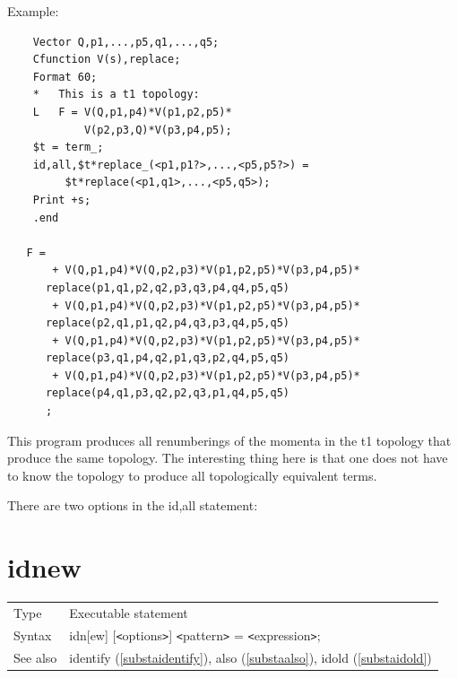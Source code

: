 \noindent Example:
\begin{verbatim}
    Vector Q,p1,...,p5,q1,...,q5;
    Cfunction V(s),replace;
    Format 60;
    *   This is a t1 topology:
    L   F = V(Q,p1,p4)*V(p1,p2,p5)*
            V(p2,p3,Q)*V(p3,p4,p5);
    $t = term_;
    id,all,$t*replace_(<p1,p1?>,...,<p5,p5?>) =
         $t*replace(<p1,q1>,...,<p5,q5>);
    Print +s;
    .end

   F =
       + V(Q,p1,p4)*V(Q,p2,p3)*V(p1,p2,p5)*V(p3,p4,p5)*
      replace(p1,q1,p2,q2,p3,q3,p4,q4,p5,q5)
       + V(Q,p1,p4)*V(Q,p2,p3)*V(p1,p2,p5)*V(p3,p4,p5)*
      replace(p2,q1,p1,q2,p4,q3,p3,q4,p5,q5)
       + V(Q,p1,p4)*V(Q,p2,p3)*V(p1,p2,p5)*V(p3,p4,p5)*
      replace(p3,q1,p4,q2,p1,q3,p2,q4,p5,q5)
       + V(Q,p1,p4)*V(Q,p2,p3)*V(p1,p2,p5)*V(p3,p4,p5)*
      replace(p4,q1,p3,q2,p2,q3,p1,q4,p5,q5)
      ;
\end{verbatim}
This program produces all renumberings of the momenta in the t1 topology 
that produce the same topology. The interesting thing here is that one does 
not have to know the topology to produce all topologically equivalent 
terms.

There are two options in the id,all statement: \hfill \\
\vspace{10mm}


\section{idnew}
\label{substaidnew}

\noindent \begin{tabular}{ll}
Type & Executable statement\\
Syntax & idn[ew] [{\tt<}options{\tt>}] {\tt<}pattern{\tt>} = {\tt<}expression{\tt>};
\\ See also & identify (\ref{substaidentify}),
              also (\ref{substaalso}),
              idold (\ref{substaidold})
\end{tabular} \vspace{4mm}

